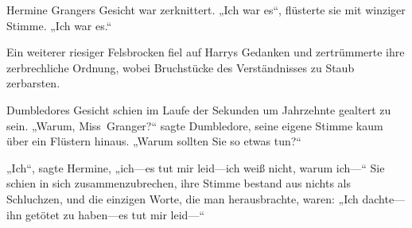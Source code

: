 Hermine Grangers Gesicht war zerknittert. „Ich war es“, flüsterte sie mit winziger Stimme. „Ich war es.“

Ein weiterer riesiger Felsbrocken fiel auf Harrys Gedanken und zertrümmerte ihre zerbrechliche Ordnung, wobei Bruchstücke des Verständnisses zu Staub zerbarsten.

Dumbledores Gesicht schien im Laufe der Sekunden um Jahrzehnte gealtert zu sein. „Warum, Miss~Granger?“ sagte Dumbledore, seine eigene Stimme kaum über ein Flüstern hinaus. „Warum sollten Sie so etwas tun?“

„Ich“, sagte Hermine, „ich—es tut mir leid—ich weiß nicht, warum ich—“
Sie schien in sich zusammenzubrechen, ihre Stimme bestand aus nichts als Schluchzen, und die einzigen Worte, die man herausbrachte, waren:
„Ich dachte—ihn getötet zu haben—es tut mir leid—“


